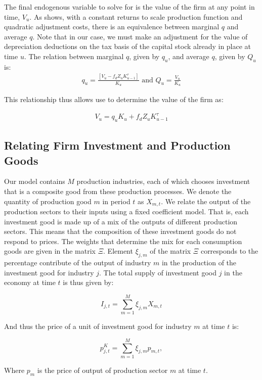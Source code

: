 The final endogenous variable to solve for is the value of the firm at any point in time, $V_{u}$.  As \citet{Hayashi1982} shows, with a constant returns to scale production function and quadratic adjustment costs, there is an equivalence between marginal $q$ and average $q$.  Note that in our case, we must make an adjustment for the value of depreciation deductions on the tax basis of the capital stock already in place at time $u$.  The relation between marginal $q$, given by $q_{u}$, and average $q$, given by $Q_{u}$ is:
 \begin{equation}
\label{eqn:avg_q}
\begin{split}
q_{u}=\frac{[V_{u}-f_{d}Z_{u}K^{\tau}_{u-1}]}{K_{u}} \text{ and } Q_{u}=\frac{V_{u}}{K_{u}}
\end{split}
\end{equation}

\noindent\noindent This relationship thus allows use to determine the value of the firm as:

 \begin{equation}
\label{eqn:solve_firmvalue}
\begin{split}
 V_{u}=q_{u}K_{u}+f_{d}Z_{u}K^{\tau}_{u-1}
\end{split}
\end{equation}


    \subsection{Relating Firm Investment and Production Goods}\label{sec:prod_invest_map}
    
    Our model contains $M$ production industries, each of which chooses investment that is a composite good from these production processes.  We denote the quantity of production good $m$ in period $t$ as $X_{m,t}$.  We relate the output of the production sectors to their inputs using a fixed coefficient model. That is, each investment good is made up of a mix of the outputs of different production sectors.  This means that the composition of these investment goods do not respond to prices.  The weights that determine the mix for each consumption goods are given in the matrix $\Xi$.  Element $\xi_{j,m}$ of the matrix $\Xi$ corresponds to the percentage contribute of the output of industry $m$ in the production of the investment good for industry $j$.  The total supply of investment good $j$ in the economy at time $t$ is thus given by: 
    
             \begin{equation} \label{eqn:mix_cons}
             I_{j,t} = \sum_{m=1}^{M}\xi_{j,m}X_{m,t} 
    	\end{equation}
	
	And thus the price of a unit of investment good for industry $m$ at time $t$ is:
	
             \begin{equation} \label{eqn:mix_cons_price}
             p^{K}_{j,t} = \sum_{m=1}^{M}\xi_{j,m}p_{m,t}, 
    	\end{equation}
    
    Where $p_{m}$ is the price of output of production sector $m$ at time $t$.




